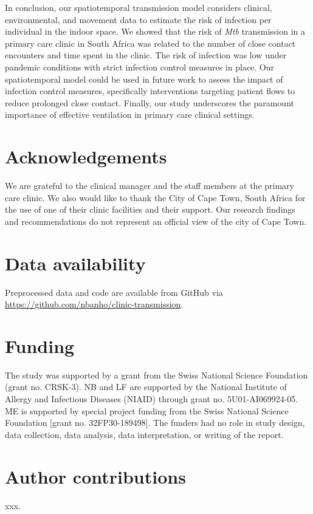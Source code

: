 \documentclass[fleqn,11pt]{wlscirep}
\begin{document}
In conclusion, our spatiotemporal transmission model considers clinical, environmental, and movement data to estimate the risk of infection per individual in the indoor space. We
showed that the risk of \emph{Mtb} transmission in a primary care clinic in South Africa was related to the number of close contact encounters and time spent in the clinic. The risk of infection was low under pandemic conditions with strict infection control measures in place. Our spatiotemporal model could be used in future work to assess the impact of infection control measures, specifically interventions targeting patient flows to reduce prolonged close contact. Finally, our study underscores the paramount importance of effective ventilation in primary care clinical settings. 


\newpage


\section*{Acknowledgements}
We are grateful to the clinical manager and the staff members at the primary care clinic. We also would like to thank the City of Cape Town, South Africa for the use of one of their clinic facilities and their support. Our research findings and recommendations do not represent an official view of the city of Cape Town. 

\section*{Data availability}
Preprocessed data and code are available from GitHub via \url{https://github.com/nbanho/clinic-transmission}.

\section*{Funding}
The study was supported by a grant from the Swiss National Science Foundation (grant no. CRSK-3).  NB and LF are supported by the National Institute of Allergy and Infectious Diseases (NIAID) through grant no. 5U01-AI069924-05. ME is supported by special project funding from the Swiss National Science Foundation [grant no. 32FP30-189498]. The funders had no role in study design, data collection, data analysis, data interpretation, or writing of the report.

\section*{Author contributions}
xxx.

\newpage


\end{document}
